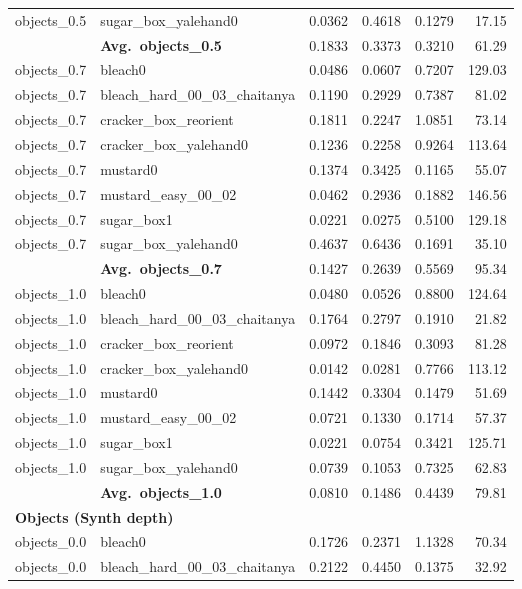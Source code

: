 \begin{longtable}{llrrrr}
  objects_0.5 & sugar\_box\_yalehand0 & 0.0362 & 0.4618 & 0.1279 & 17.15 \\
  \cmidrule{2-6}
  & \textbf{Avg.~objects_0.5} & 0.1833 & 0.3373 & 0.3210 & 61.29 \\
  \midrule
  objects_0.7 & bleach0 & 0.0486 & 0.0607 & 0.7207 & 129.03 \\
  objects_0.7 & bleach\_hard\_00\_03\_chaitanya & 0.1190 & 0.2929 & 0.7387 & 81.02 \\
  objects_0.7 & cracker\_box\_reorient & 0.1811 & 0.2247 & 1.0851 & 73.14 \\
  objects_0.7 & cracker\_box\_yalehand0 & 0.1236 & 0.2258 & 0.9264 & 113.64 \\
  objects_0.7 & mustard0 & 0.1374 & 0.3425 & 0.1165 & 55.07 \\
  objects_0.7 & mustard\_easy\_00\_02 & 0.0462 & 0.2936 & 0.1882 & 146.56 \\
  objects_0.7 & sugar\_box1 & 0.0221 & 0.0275 & 0.5100 & 129.18 \\
  objects_0.7 & sugar\_box\_yalehand0 & 0.4637 & 0.6436 & 0.1691 & 35.10 \\
  \cmidrule{2-6}
  & \textbf{Avg.~objects_0.7} & 0.1427 & 0.2639 & 0.5569 & 95.34 \\
  \midrule
  objects_1.0 & bleach0 & 0.0480 & 0.0526 & 0.8800 & 124.64 \\
  objects_1.0 & bleach\_hard\_00\_03\_chaitanya & 0.1764 & 0.2797 & 0.1910 & 21.82 \\
  objects_1.0 & cracker\_box\_reorient & 0.0972 & 0.1846 & 0.3093 & 81.28 \\
  objects_1.0 & cracker\_box\_yalehand0 & 0.0142 & 0.0281 & 0.7766 & 113.12 \\
  objects_1.0 & mustard0 & 0.1442 & 0.3304 & 0.1479 & 51.69 \\
  objects_1.0 & mustard\_easy\_00\_02 & 0.0721 & 0.1330 & 0.1714 & 57.37 \\
  objects_1.0 & sugar\_box1 & 0.0221 & 0.0754 & 0.3421 & 125.71 \\
  objects_1.0 & sugar\_box\_yalehand0 & 0.0739 & 0.1053 & 0.7325 & 62.83 \\
  \cmidrule{2-6}
  & \textbf{Avg.~objects_1.0} & 0.0810 & 0.1486 & 0.4439 & 79.81 \\
  \midrule
\multicolumn{6}{l}{\textbf{Objects (Synth depth)}} \\
\midrule
  objects_0.0 & bleach0 & 0.1726 & 0.2371 & 1.1328 & 70.34 \\
  objects_0.0 & bleach\_hard\_00\_03\_chaitanya & 0.2122 & 0.4450 & 0.1375 & 32.92 \\

\end{longtable}

